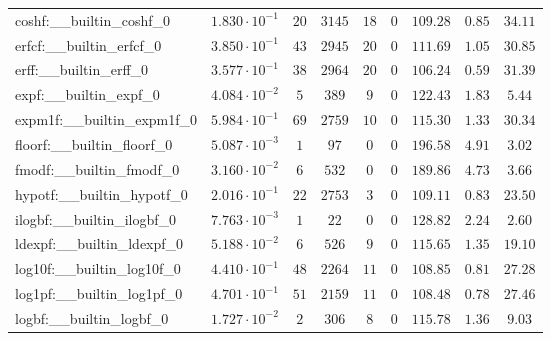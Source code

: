 \begin{tabular}{|l|c|c|c|c|c|c|c|c|}
coshf:\_\_builtin\_coshf\_0               & $ 1.830 \cdot 10^{-1} $ & $ 20     $ & $ 3145  $ & $ 18  $ & $ 0   $ & $ 109.28      $ & $ 0.85    $ & $ 34.11   $ \\
erfcf:\_\_builtin\_erfcf\_0               & $ 3.850 \cdot 10^{-1} $ & $ 43     $ & $ 2945  $ & $ 20  $ & $ 0   $ & $ 111.69      $ & $ 1.05    $ & $ 30.85   $ \\
erff:\_\_builtin\_erff\_0                 & $ 3.577 \cdot 10^{-1} $ & $ 38     $ & $ 2964  $ & $ 20  $ & $ 0   $ & $ 106.24      $ & $ 0.59    $ & $ 31.39   $ \\
expf:\_\_builtin\_expf\_0                 & $ 4.084 \cdot 10^{-2} $ & $ 5      $ & $ 389   $ & $ 9   $ & $ 0   $ & $ 122.43      $ & $ 1.83    $ & $ 5.44    $ \\
expm1f:\_\_builtin\_expm1f\_0             & $ 5.984 \cdot 10^{-1} $ & $ 69     $ & $ 2759  $ & $ 10  $ & $ 0   $ & $ 115.30      $ & $ 1.33    $ & $ 30.34   $ \\
floorf:\_\_builtin\_floorf\_0             & $ 5.087 \cdot 10^{-3} $ & $ 1      $ & $ 97    $ & $ 0   $ & $ 0   $ & $ 196.58      $ & $ 4.91    $ & $ 3.02    $ \\
fmodf:\_\_builtin\_fmodf\_0               & $ 3.160 \cdot 10^{-2} $ & $ 6      $ & $ 532   $ & $ 0   $ & $ 0   $ & $ 189.86      $ & $ 4.73    $ & $ 3.66    $ \\
hypotf:\_\_builtin\_hypotf\_0             & $ 2.016 \cdot 10^{-1} $ & $ 22     $ & $ 2753  $ & $ 3   $ & $ 0   $ & $ 109.11      $ & $ 0.83    $ & $ 23.50   $ \\
ilogbf:\_\_builtin\_ilogbf\_0             & $ 7.763 \cdot 10^{-3} $ & $ 1      $ & $ 22    $ & $ 0   $ & $ 0   $ & $ 128.82      $ & $ 2.24    $ & $ 2.60    $ \\
ldexpf:\_\_builtin\_ldexpf\_0             & $ 5.188 \cdot 10^{-2} $ & $ 6      $ & $ 526   $ & $ 9   $ & $ 0   $ & $ 115.65      $ & $ 1.35    $ & $ 19.10   $ \\
log10f:\_\_builtin\_log10f\_0             & $ 4.410 \cdot 10^{-1} $ & $ 48     $ & $ 2264  $ & $ 11  $ & $ 0   $ & $ 108.85      $ & $ 0.81    $ & $ 27.28   $ \\
log1pf:\_\_builtin\_log1pf\_0             & $ 4.701 \cdot 10^{-1} $ & $ 51     $ & $ 2159  $ & $ 11  $ & $ 0   $ & $ 108.48      $ & $ 0.78    $ & $ 27.46   $ \\
logbf:\_\_builtin\_logbf\_0               & $ 1.727 \cdot 10^{-2} $ & $ 2      $ & $ 306   $ & $ 8   $ & $ 0   $ & $ 115.78      $ & $ 1.36    $ & $ 9.03    $ \\

\end{tabular}
